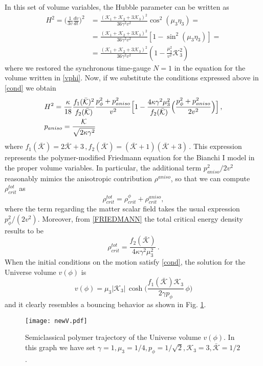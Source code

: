 \documentclass[aps,prd,twocolumn,nofootinbib,superscriptaddress]{revtex4-2}
\begin{document}
In this set of volume variables, the Hubble parameter can be written as
\begin{equation}
	\begin{aligned}
		H^2=\Big(\frac{1}{3v}\frac{dv}{dt}\Big)^2&=\frac{(\mathcal{K}_1+\mathcal{K}_2+3\mathcal{K}_3)^2}{36\gamma^2v^2}\cos^2(\mu_3\eta_3)=\\
		&=\frac{(\mathcal{K}_1+\mathcal{K}_2+3\mathcal{K}_3)^2}{36\gamma^2v^2}[1-\sin^2(\mu_3\eta_3)]=\\&=\frac{(\mathcal{K}_1+\mathcal{K}_2+3\mathcal{K}_3)^2}{36\gamma^2v^2}(1-\frac{\mu_3^2}{v^2}\mathcal{K}_3^2)
		\label{BF}
	\end{aligned}
\end{equation}
where we restored the synchronous time-gauge $N=1$ in the equation for the volume written in \eqref{vphi}. Now, if we substitute the conditions expressed above in \eqref{cond} we obtain
\begin{equation}
	\label{FRIEDMANN}
	\begin{aligned}
	&H^2=\frac{\kappa}{18}\frac{f_1(\bar{\mathcal{K}})^2}{f_2(\bar{\mathcal{K}})}\frac{p_\phi^2+p_{aniso}^2}{v^2}\Big[1-\frac{4\kappa\gamma^2\mu_3^2}{f_2(\bar{\mathcal{K}})}\Big(\frac{p_\phi^2+p_{aniso}^2}{2v^2}\Big)\Big]\,,\\
	&p_{aniso}={\mathcal{K}\over{\sqrt{2\kappa\gamma^2}}}
	\end{aligned}
\end{equation}
where  $f_1(\bar{\mathcal{K}})=2\bar{\mathcal{K}}+3\,,f_2(\bar{\mathcal{K}})=(\bar{\mathcal{K}}+1)(\bar{\mathcal{K}}+3)\,.$
This expression represents the polymer-modified Friedmann equation for the Bianchi I model in the proper volume variables. In particular, the additional term $p_{aniso}^2/2v^2$ reasonably mimics the anisotropic contribution $\rho^{aniso}$, so that we can compute $\rho^{tot}_{crit}$ as
\begin{equation}
	\label{tced}
	\rho^{tot}_{crit}=\rho^\phi_{crit}+\rho^{aniso}_{crit},
\end{equation}
where the term regarding the matter scalar field takes the usual expression $p_\phi^2/(2v^2)$.
Moreover, from \eqref{FRIEDMANN} the total critical energy density results to be
\begin{equation}
	\rho^{tot}_{crit}=\frac{f_2(\bar{\mathcal{K}})}{4\kappa\gamma^2\mu_3^2}\,.
	\label{tcedv}
\end{equation}
When the initial conditions on the motion satisfy \eqref{cond}, the solution for the Universe volume $v(\phi)$ is
\begin{equation}
	v(\phi)=\mu_3|\mathcal{K}_3|\,\cosh\bigg(\frac{f_1(\bar{\mathcal{K}})\mathcal{K}_3}{2\gamma p_\phi}\,\phi\bigg)
	\label{vphii}
\end{equation}
and it clearly resembles a bouncing behavior as shown in Fig. \ref{vol}.
\begin{figure}[htbp]
	\centering
	\texttt{[image: newV.pdf]}
	\caption{Semiclassical polymer trajectory of the Universe volume $v(\phi)$. In this graph we have set $\gamma=1,\mu_3=1/4,p_\phi=1/\sqrt{2},\mathcal{K}_3=3,\bar{\mathcal{K}}=1/2$.}
	\label{vol}
\end{figure}
\end{document}
